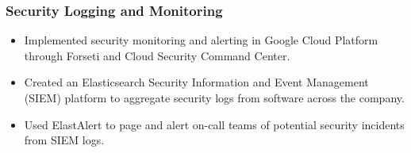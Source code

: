 \documentclass[letterpaper]{article}
\begin{document}
\subsubsection*{Security Logging and Monitoring}
\begin{itemize}[noitemsep]
	\item Implemented security monitoring and alerting in Google Cloud Platform through Forseti and Cloud Security Command Center.
	\item Created an Elasticsearch Security Information and Event Management (SIEM) platform to aggregate security logs from software across the company.
	\item Used ElastAlert to page and alert on-call teams of potential security incidents from SIEM logs.
\end{itemize}
\end{document}

